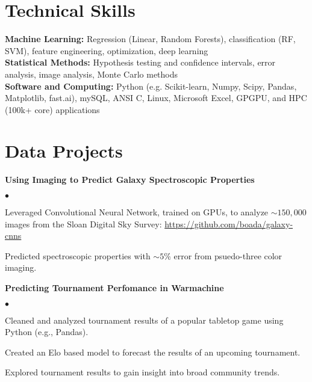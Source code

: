 \documentclass[margin,line, 11pt]{res}
\newenvironment{list2}{
  \begin{list}{$\bullet$}{%
      \setlength{\itemsep}{0in}
      \setlength{\parsep}{0in} \setlength{\parskip}{0in}
      \setlength{\topsep}{0in} \setlength{\partopsep}{0in}
      \setlength{\leftmargin}{0.2in}}}{\end{list}}
\begin{document}
\begin{resume}
\section{Technical Skills}
\textbf{Machine Learning:} Regression (Linear, Random Forests), classification (RF, SVM), feature engineering, optimization, deep learning\\
\textbf{Statistical Methods:} Hypothesis testing and confidence intervals, error analysis, image analysis, Monte Carlo methods\\
\textbf{Software and Computing:}  Python (e.g. Scikit-learn, Numpy, Scipy, Pandas, Matplotlib, fast.ai), mySQL, ANSI C, Linux, Microsoft Excel, GPGPU, and HPC (100k+ core) applications\\
\vspace*{-10mm}

\section{Data Projects}
\textbf{Using Imaging to Predict Galaxy Spectroscopic Properties}\newline
    \begin{list2}
    	\vspace*{-5mm}
    	\item Leveraged Convolutional Neural Network, trained on GPUs, to analyze $\sim150,000$ images from the Sloan Digital Sky Survey: \url{https://github.com/boada/galaxy-cnns}
    	\item Predicted spectroscopic properties with $\sim5\%$ error from psuedo-three color imaging.
    \end{list2}
    \vspace*{-4mm}
\textbf{Predicting Tournament Perfomance in Warmachine}\newline
    \begin{list2}
    	\vspace*{-5mm}
    	\item Cleaned and analyzed tournament results of a popular tabletop game using Python (e.g., Pandas).
    	\item Created an Elo based model to forecast the results of an upcoming tournament.
    	\item Explored tournament results to gain insight into broad community trends.
    \end{list2}
\vspace*{-4mm}


\end{resume}
\end{document}
